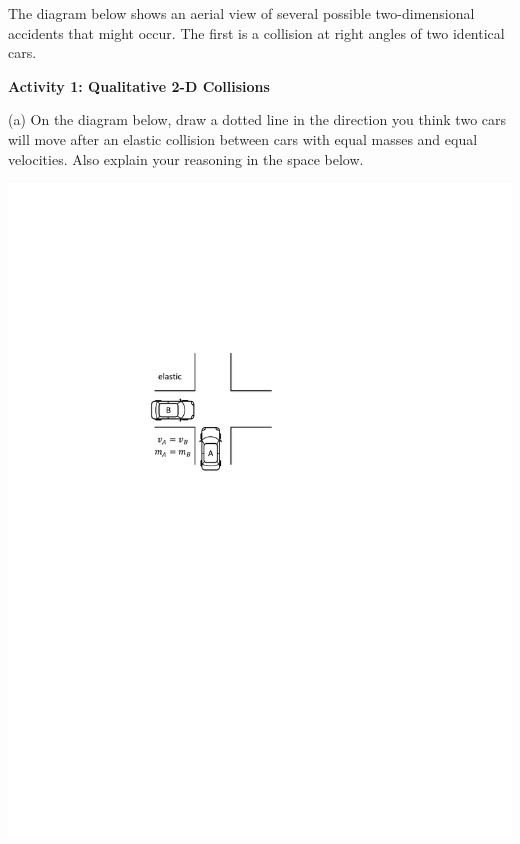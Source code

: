 
The diagram below shows an aerial view of several possible two-dimensional accidents
that might occur. The first is a collision at right angles of two identical
cars.


\textbf{Activity 1: Qualitative 2-D Collisions }

(a) On the diagram below, draw a dotted line in the direction you think
two cars will move after an elastic collision between cars with equal masses and equal velocities.
Also explain your reasoning in the space below.

\hspace{0.3in}
\includegraphics{twod_collisions/two_equal_cars.pdf}

